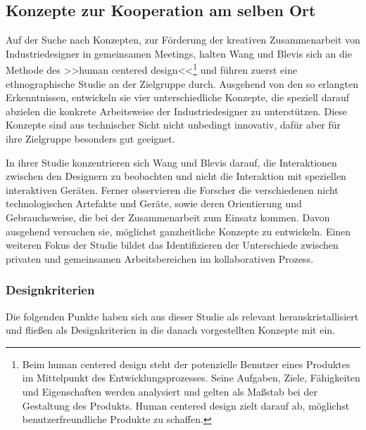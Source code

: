 \subsection{Konzepte zur Kooperation am selben Ort}

Auf der Suche nach Konzepten, zur Förderung der kreativen Zusammenarbeit von Industriedesigner in gemeinsamen Meetings, halten Wang und Blevis \citep{Wang:2004p110} sich an die Methode des >>human centered design<<\footnote{Beim human centered design steht der potenzielle Benutzer eines Produktes im Mittelpunkt des Entwicklungsprozesses. Seine Aufgaben, Ziele, Fähigkeiten und Eigenschaften werden analysiert und gelten als Maßstab bei der Gestaltung des Produkts. Human centered design zielt darauf ab, möglichst benutzerfreundliche Produkte zu schaffen.} und führen zuerst eine ethnographische Studie an der Zielgruppe durch. Ausgehend von den so erlangten Erkenntnissen, entwickeln sie vier unterschiedliche Konzepte, die speziell darauf abzielen die konkrete Arbeitsweise der Industriedesigner zu unterstützen. Diese Konzepte sind aus technischer Sicht nicht unbedingt innovativ, dafür aber für ihre Zielgruppe besonders gut geeignet.

In ihrer Studie konzentrieren sich Wang und Blevis \citep{Wang:2004p110} darauf, die Interaktionen zwischen den Designern zu beobachten und nicht die Interaktion mit speziellen interaktiven Geräten. Ferner observieren die Forscher die verschiedenen nicht technologischen Artefakte und Geräte, sowie deren Orientierung und Gebrauchsweise, die bei der Zusammenarbeit zum Einsatz kommen. Davon ausgehend versuchen sie, möglichst ganzheitliche Konzepte zu entwickeln. Einen weiteren Fokus der Studie bildet das Identifizieren der Unterschiede zwischen privaten und gemeinsamen Arbeitsbereichen im kollaborativen Prozess.

\subsubsection{Designkriterien}

Die folgenden Punkte haben sich aus dieser Studie als relevant herauskristallisiert und fließen als Designkriterien in die danach vorgestellten Konzepte mit ein.


